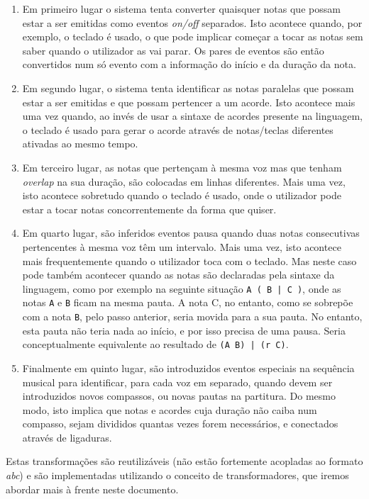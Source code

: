\begin{enumerate}
 \item Em primeiro lugar o sistema tenta converter quaisquer notas que possam estar a ser emitidas como eventos \textit{on/off} separados. Isto acontece quando, por exemplo, o teclado é usado, o que pode implicar começar a tocar as notas sem saber quando o utilizador as vai parar. Os pares de eventos são então convertidos num só evento com a informação do início e da duração da nota.
 \item Em segundo lugar, o sistema tenta identificar as notas paralelas que possam estar a ser emitidas e que possam pertencer a um acorde. Isto acontece mais uma vez quando, ao invés de usar a sintaxe de acordes presente na linguagem, o teclado é usado para gerar o acorde através de notas/teclas diferentes ativadas ao mesmo tempo.
 \item Em terceiro lugar, as notas que pertençam à mesma voz mas que tenham \textit{overlap} na sua duração, são colocadas em linhas diferentes. Mais uma vez, isto acontece sobretudo quando o teclado é usado, onde o utilizador pode estar a tocar notas concorrentemente da forma que quiser.
 \item Em quarto lugar, são inferidos eventos pausa quando duas notas consecutivas pertencentes à mesma voz têm um intervalo. Mais uma vez, isto acontece mais frequentemente quando o utilizador toca com o teclado. Mas neste caso pode também acontecer quando as notas são declaradas pela sintaxe da linguagem, como por exemplo na seguinte situação \texttt{A ( B | C )}, onde as notas \texttt{A} e \texttt{B} ficam na mesma pauta. A nota C, no entanto, como se sobrepõe com a nota \texttt{B}, pelo passo anterior, seria movida para a sua pauta. No entanto, esta pauta não teria nada ao início, e por isso precisa de uma pausa. Seria conceptualmente equivalente ao resultado de \texttt{(A B) | (r C)}.
 \item Finalmente em quinto lugar, são introduzidos eventos especiais na sequência musical para identificar, para cada voz em separado, quando devem ser introduzidos novos compassos, ou novas pautas na partitura. Do mesmo modo, isto implica que notas e acordes cuja duração não caiba num compasso, sejam divididos quantas vezes forem necessários, e conectados através de \gls{ligaduras}.
\end{enumerate}

Estas transformações são reutilizáveis (não estão fortemente acopladas ao formato \textit{abc}) e são implementadas utilizando o conceito de transformadores, que iremos abordar mais à frente neste documento.

